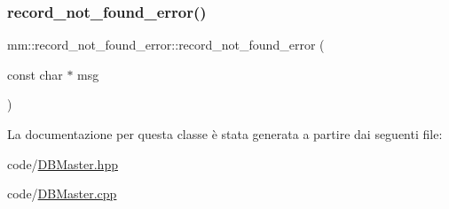 \subsubsection{\texorpdfstring{record\+\_\+not\+\_\+found\+\_\+error()}{record\_not\_found\_error()}\hspace{0.1cm}{\footnotesize\ttfamily [2/2]}}
{\footnotesize\ttfamily mm\+::record\+\_\+not\+\_\+found\+\_\+error\+::record\+\_\+not\+\_\+found\+\_\+error (\begin{DoxyParamCaption}\item[{const char $\ast$}]{msg }\end{DoxyParamCaption})\hspace{0.3cm}{\ttfamily [explicit]}}



La documentazione per questa classe è stata generata a partire dai seguenti file\+:\begin{DoxyCompactItemize}
\item 
code/\mbox{\hyperlink{_d_b_master_8hpp}{D\+B\+Master.\+hpp}}\item 
code/\mbox{\hyperlink{_d_b_master_8cpp}{D\+B\+Master.\+cpp}}\end{DoxyCompactItemize}
